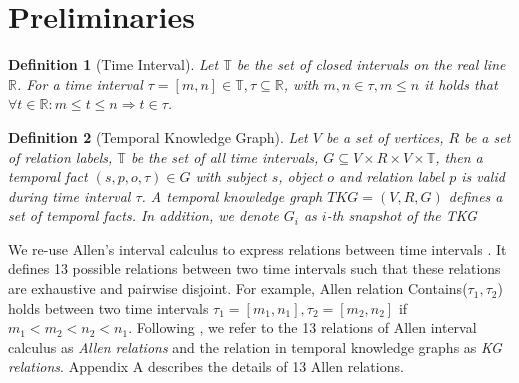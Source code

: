 \documentclass[letterpaper]{article} %
\newcommand{\Tau}{\mathbb{T}}
\newtheorem{definition}{Definition}
\begin{document}
\section{Preliminaries}

\begin{definition}[Time Interval]
Let $\Tau$ be the set of closed intervals on the real line $\mathbb{R}$. For a time interval  $\tau=[m,n] \in\Tau, \tau\subseteq \mathbb{R}$, with $m,n\in \tau, m\leq n$ it holds that $\forall t\in \mathbb{R}: m\leq t\leq n\Rightarrow t\in\tau $.
\end{definition}


\begin{definition}[Temporal Knowledge Graph]
Let $V$ be a set of vertices, $R$ be a set of relation labels, $\Tau$ be the set of all time intervals,
$G\subseteq V\times R \times V \times \Tau$, then a temporal fact $(s,p,o,\tau)\in G$ with subject $s$, object $o$ and relation label $p$ is valid during time interval $\tau$. A temporal knowledge graph $TKG=(V,R,G)$ defines a set of temporal facts. In addition,
we denote $G_i$ as $i$-th snapshot of the TKG
\end{definition}

We re-use Allen’s interval calculus to express relations between time intervals \cite{allen1983maintaining}. It defines 13 possible relations between two time intervals such that these relations are exhaustive and pairwise disjoint. For example, Allen relation Contains($\tau_1, \tau_2$) holds between two time intervals $\tau_1=[m_1,n_1], \tau_2=[m_2,n_2]$ if $m_1<m_2<n_2<n_1$. Following \cite{singh2023neustip}, we refer to the 13 relations of Allen interval calculus as \textit{Allen relations} and the relation in temporal knowledge graphs as \textit{KG relations}. Appendix A describes the details of 13 Allen relations.
\end{document}
